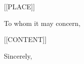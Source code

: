 \documentclass{letter}
\begin{document}
\begin{letter}{[[PLACE]]}
\date{[[DATE]]}
\opening{To whom it may concern,}

[[CONTENT]]

\closing{Sincerely, \\ [Your Name]}
\end{letter}
\end{document}
